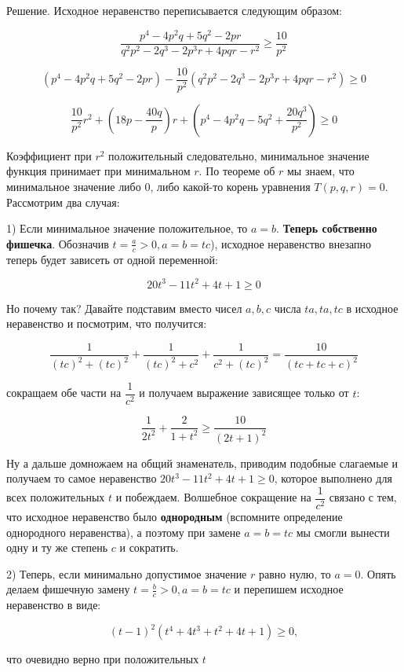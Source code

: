 Решение. Исходное неравенство переписывается следующим образом:

$$
\frac{p^4-4 p^2 q+5 q^2-2 p r}{q^2 p^2-2 q^3-2 p^3 r+4 p q r-r^2} \geqslant \frac{10}{p^2}
$$

$$
\left(p^4-4 p^2 q+5 q^2-2 p r\right)-\frac{10}{p^2}\left(q^2 p^2-2 q^3-2 p^3 r+4 p q r-r^2\right)\geq 0
$$

$$
\frac{10}{p^2} r^2+\left(18 p-\frac{40 q}{p}\right) r+\left(p^4-4 p^2 q-5 q^2+\frac{20 q^3}{p^2}\right) \geqslant 0
$$


Коэффициент при $r^2$ положительный следовательно, минимальное значение функция принимает при минимальном $r$. По теореме об $r$ мы знаем, что минимальное значение либо $0$, либо какой-то корень уравнения $T(p,q,r)=0$. Рассмотрим два случая:

1) Если минимальное значение положительное, то $a=b$. \textbf{Теперь собственно фишечка}. Обозначив $t=\frac{a}{c}>0,a = b = tc$), исходное неравенство внезапно теперь будет зависеть от одной переменной:

$$
20 t^3-11 t^2+4 t+1 \geqslant 0
$$

Но почему так? Давайте подставим вместо чисел $a,b,c$ числа $ta, ta, tc$ в исходное неравенство и посмотрим, что получится:

$$
\frac{1}{(t c)^2+(t c)^2}+\frac{1}{(t c)^2+c^2}+\frac{1}{c^2+(t c)^2} = \frac{10}{(t c+t c+c)^2}
$$

сокращаем обе части на $\dfrac{1}{c^2}$ и получаем выражение зависящее только от $t$:

$$
\frac{1}{2 t^2}+\frac{2}{1+t^2} \geq \frac{10}{(2 t+1)^2}
$$

Ну а дальше домножаем на общий знаменатель, приводим подобные слагаемые  и получаем то самое неравенство $20t^3-11t^2+4 t+1 \geqslant 0$, которое выполнено для всех положительных $t$ и побеждаем. Волшебное сокращение на $\dfrac{1}{c^2}$ связано с тем, что исходное неравенство было \textbf{однородным} (вспомните определение однородного неравенства), а поэтому при замене $a=b=tc$ мы смогли вынести одну и ту же степень $c$ и сократить.


\newpage

\hspace{3mm}

2) Теперь, если минимально допустимое значение $r$ равно нулю, то $a=0$. Опять делаем фишечную замену $t=\frac{b}{c}>0, a = b = tc$ и перепишем исходное неравенство в виде:

$$
(t-1)^2\left(t^4+4 t^3+t^2+4 t+1\right) \geqslant 0,
$$

что очевидно верно при положительных $t$